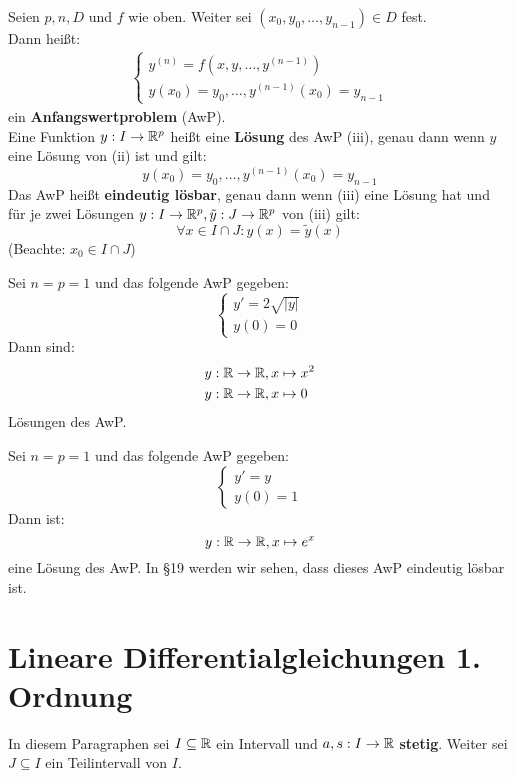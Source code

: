 \documentclass[a4paper,twoside,DIV15,BCOR12mm,chapterprefix=true,headings=twolinechapter]{scrbook}
\begin{document}
\begin{definition}
Seien $p,n,D$ und $f$ wie oben. Weiter sei $(x_0,y_0,\ldots,y_{n-1})\in D$ fest.\\
Dann heißt:
\begin{align*}
\begin{cases}y^{(n)}=f(x,y,\ldots,y^{(n-1)})\\
y(x_0)=y_0,\ldots,y^{(n-1)}(x_0)=y_{n-1}\end{cases}\tag{iii}
\end{align*}
ein \textbf{Anfangswertproblem} (AwP).\\
Eine Funktion $y:I\to\mathbb{R}^p$ heißt eine \textbf{Lösung} des AwP (iii), genau dann
wenn $y$ eine Lösung von (ii) ist und gilt:
\[y(x_0)=y_0,\ldots,y^{(n-1)}(x_0)=y_{n-1}\]
Das AwP heißt \textbf{eindeutig lösbar}, genau dann wenn (iii) eine Lösung hat und
für je zwei Lösungen $y:I\to\mathbb{R}^p,\tilde y:J\to\mathbb{R}^p$ von (iii) gilt:
\[\forall x\in I\cap J:y(x)=\tilde y(x)\]
(Beachte: $x_0\in I\cap J$)
\end{definition}

\begin{beispiele}
\item Sei $n=p=1$ und das folgende AwP gegeben:
\[\begin{cases}
y'=2\sqrt{|y|}\\
y(0)=0
\end{cases}\]
Dann sind:
\begin{align*}
&y:\mathbb{R}\to\mathbb{R}, x\mapsto x^2\\
&y:\mathbb{R}\to\mathbb{R}, x\mapsto 0
\end{align*}
Lösungen des AwP.
\item Sei $n=p=1$ und das folgende AwP gegeben:
\[\begin{cases}
y'=y\\
y(0)=1
\end{cases}\]
Dann ist:
\[y:\mathbb{R}\to\mathbb{R}, x\mapsto e^x\]
eine Lösung des AwP. In §19 werden wir sehen, dass dieses AwP eindeutig lösbar ist.
\end{beispiele}

\chapter{Lineare Differentialgleichungen 1. Ordnung}
In diesem Paragraphen sei $I\subseteq\mathbb{R}$ ein Intervall und $a,s:I\to\mathbb{R}$ \textbf{stetig}.
Weiter sei $J\subseteq I$ ein Teilintervall von $I$.
\end{document}
